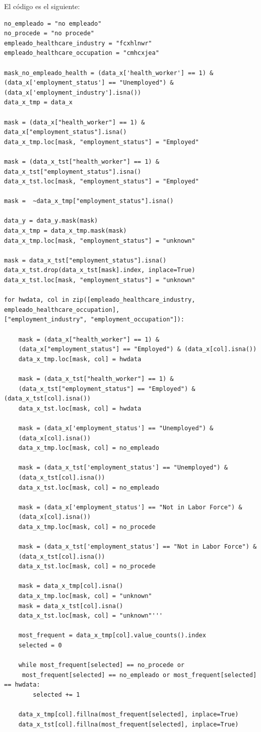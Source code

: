 \documentclass[twoside,openright,titlepage,numbers=noenddot,openany,headinclude,footinclude=true,
cleardoublepage=empty,abstractoff,BCOR=5mm,paper=a4,fontsize=12pt,main=spanish]{scrreprt}
\begin{document}
El código es el siguiente:

\begin{verbatim}
no_empleado = "no empleado"
no_procede = "no procede"
empleado_healthcare_industry = "fcxhlnwr"
empleado_healthcare_occupation = "cmhcxjea"

mask_no_empleado_health = (data_x['health_worker'] == 1) & 
(data_x['employment_status'] == "Unemployed") & (data_x['employment_industry'].isna())
data_x_tmp = data_x

mask = (data_x["health_worker"] == 1) &  data_x["employment_status"].isna() 
data_x_tmp.loc[mask, "employment_status"] = "Employed" 

mask = (data_x_tst["health_worker"] == 1) &  data_x_tst["employment_status"].isna() 
data_x_tst.loc[mask, "employment_status"] = "Employed" 

mask =  ~data_x_tmp["employment_status"].isna() 

data_y = data_y.mask(mask)
data_x_tmp = data_x_tmp.mask(mask)
data_x_tmp.loc[mask, "employment_status"] = "unknown"

mask = data_x_tst["employment_status"].isna() 
data_x_tst.drop(data_x_tst[mask].index, inplace=True)
data_x_tst.loc[mask, "employment_status"] = "unknown"

for hwdata, col in zip([empleado_healthcare_industry, empleado_healthcare_occupation],
["employment_industry", "employment_occupation"]):

    mask = (data_x["health_worker"] == 1) & 
    (data_x["employment_status"] == "Employed") & (data_x[col].isna())
    data_x_tmp.loc[mask, col] = hwdata

    mask = (data_x_tst["health_worker"] == 1) & 
    (data_x_tst["employment_status"] == "Employed") & (data_x_tst[col].isna())
    data_x_tst.loc[mask, col] = hwdata

    mask = (data_x['employment_status'] == "Unemployed") & 
    (data_x[col].isna())
    data_x_tmp.loc[mask, col] = no_empleado

    mask = (data_x_tst['employment_status'] == "Unemployed") & 
    (data_x_tst[col].isna())
    data_x_tst.loc[mask, col] = no_empleado

    mask = (data_x['employment_status'] == "Not in Labor Force") & 
    (data_x[col].isna())
    data_x_tmp.loc[mask, col] = no_procede

    mask = (data_x_tst['employment_status'] == "Not in Labor Force") & 
    (data_x_tst[col].isna())
    data_x_tst.loc[mask, col] = no_procede

    mask = data_x_tmp[col].isna()
    data_x_tmp.loc[mask, col] = "unknown"
    mask = data_x_tst[col].isna()
    data_x_tst.loc[mask, col] = "unknown"'''
    
    most_frequent = data_x_tmp[col].value_counts().index
    selected = 0

    while most_frequent[selected] == no_procede or
     most_frequent[selected] == no_empleado or most_frequent[selected] == hwdata:
        selected += 1
        
    data_x_tmp[col].fillna(most_frequent[selected], inplace=True)
    data_x_tst[col].fillna(most_frequent[selected], inplace=True)
\end{verbatim}
\end{document}
